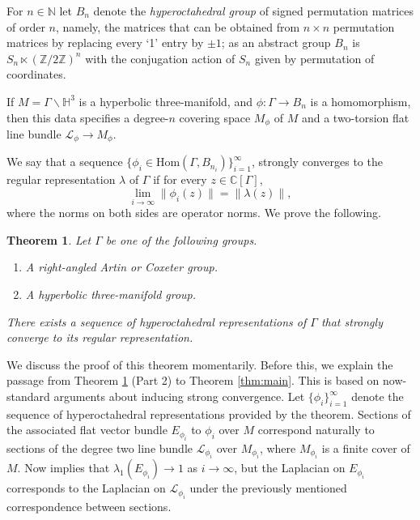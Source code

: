 \documentclass[12pt]{article}
\newtheorem{theorem}{Theorem}[section]
\newcommand{\N}{\mathbb{N}}
\newcommand{\Z}{\mathbb{Z}}
\newcommand{\C}{\mathbb{C}}
\newcommand{\Hom}{\text{Hom}}
\newcommand{\1}{\mathds{1}}
\begin{document}
For $n\in \N$ let $B_n$  denote the \emph{hyperoctahedral group} of signed permutation matrices of order $n$, namely, the matrices that can be obtained from $n\times n$ permutation matrices by replacing every `1' entry by $\pm 1$; as an abstract group $B_n$ is $S_n \ltimes (\Z / 2 \Z)^n$ with the conjugation action of $S_n$ given by permutation of coordinates.

If $M = \Gamma \backslash \mathbb{H}^3$  is a hyperbolic three-manifold, and $\phi : \Gamma\to B_n$ is a homomorphism, then this data specifies a degree-$n$ covering space $M_\phi$ of $M$ and a two-torsion flat line bundle $\mathcal{L}_\phi\to M_\phi$.

We say that a sequence $\{\phi_i \in \Hom(\Gamma, B_{n_i})\}_{i=1}^\infty$,  strongly converges to the regular representation $\lambda$ of $\Gamma$ if for every $z\in \C[\Gamma]$,
\[
\lim_{i\to\infty} \| \phi_i(z) \| = \| \lambda(z) \|,
\]
where the norms on both sides are operator norms.
We prove the following.
\begin{theorem}\label{thm:strong_convergence_hyp-3-mfold}
Let $\Gamma$ be one of the following groups.
\begin{enumerate}
    \item A right-angled Artin or Coxeter group.
    \item A hyperbolic three-manifold group. 
\end{enumerate}
There exists a sequence of hyperoctahedral representations of $\Gamma$ that strongly converge to its regular representation.
\end{theorem}

We discuss the proof of this theorem momentarily. Before this, we explain the passage from Theorem \ref{thm:strong_convergence_hyp-3-mfold} (Part 2) to Theorem \ref{thm:main}. This is based on now-standard arguments about inducing strong convergence.
Let $\{ \phi_i \}_{i=1}^\infty$  denote the sequence of hyperoctahedral representations provided by the theorem.
Sections of the associated flat vector bundle $E_{\phi_i}$ to $\phi_i$  over $M$ correspond naturally to sections of the degree two line bundle $\mathcal{L}_{\phi_i}$ over $M_{\phi_i}$, where $M_{\phi_i}$  is a finite cover of $M$. 
Now \cite[Theorem 6.1]{MageeThomas} implies that $\lambda_1(E_{\phi_i}) \to 1$ as $i\to\infty$, but the Laplacian on $E_{\phi_i}$ corresponds to the Laplacian on $\mathcal{L}_{\phi_i}$ under the previously mentioned correspondence between sections.
\end{document}
